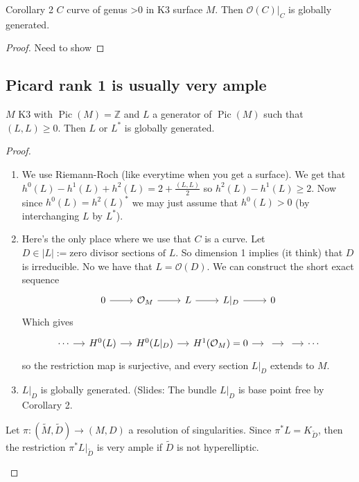 \begin{idea6}{Corollary 2}\leavevmode
$C$ curve of genus >0 in K3 surface $M$. Then $\mathcal{O}(C)|_{C}$ is globally generated.
\end{idea6}

\begin{proof}\leavevmode
	Need to show 
\end{proof}

\subsection{Picard rank 1 is usually very ample}

\begin{thm}\leavevmode
	$M$ K3 with $\operatorname{Pic}(M) =\mathbb{Z}$ and $L$ a generator of $\operatorname{Pic}(M)$ such that $(L,L)\geq 0$. Then $L$ or $L^*$ is globally generated.
\end{thm}

\begin{proof}\leavevmode
	\begin{enumerate}[label=\textbf{Step \arabic*}]
		\item We use Riemann-Roch (like everytime when you get a surface). We get that $h^{0}(L)-h^{1}(L)+h^{2}(L)=2+\frac{(L,L)}{2}$ so $h^{2}(L)-h^{1}(L)\geq 2$. Now since $h^{0}(L)=h^{2}(L)^*$ we may just assume that $h^{0}(L)>0$ (by interchanging $L$ by $L^*$).

		\item Here's the only place where we use that $C$ is a curve. Let $D\in |L|:=\text{zero divisor sections of $L$} $. So dimension 1 implies (it think) that $D$ is irreducible. No we have that $L=\mathcal{O}(D)$. We can construct the short exact sequence
			\[\begin{tikzcd}
				0\arrow[r]&\mathcal{O}_M\arrow[r]&L\arrow[r]&L|_{D}\arrow[r]&0
			\end{tikzcd}\]
			Which gives
			\[\begin{tikzcd}[column sep=small]
				\cdots\arrow[r]&H^{0}(L)\arrow[r]&H^{0}(L|_{D})\arrow[r]&H^{1}(\mathcal{O}_M)=0\arrow[r]&\arrow[r]&\arrow[r]&\cdots
			\end{tikzcd}\]
			so the restriction map is surjective, and every section $L|_{D}$ extends to $M$.

		\item $L|_{D}$ is globally generated. ({\color{4}Slides:} The bundle $L|_{D}$ is base point free by Corollary 2.
	\end{enumerate}

	\begin{remark}\leavevmode
		Let $\pi:(\tilde{M},\tilde{D})\longrightarrow (M,D)$ a resolution of singularities. Since $\pi^* L=K_{\tilde{D}}$, then the restriction $\pi^* L |_{\tilde{D}}$ is very ample if $\tilde{D}$ is not hyperelliptic.
	\end{remark}
\end{proof}

